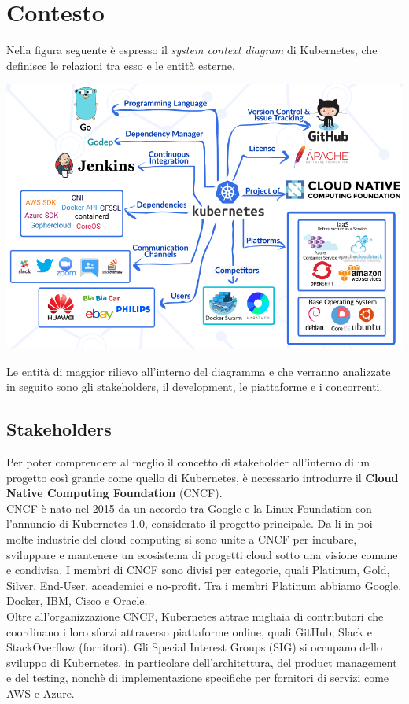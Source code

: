 \documentclass[12pt, a4paper]{report}
\begin{document}
\section{Contesto}
Nella figura seguente è espresso il \textit{system context diagram} di Kubernetes, che definisce le relazioni tra esso e le entità esterne.
\begin{center}
  \includegraphics[scale = 0.6]{Images/ContextModelDiagram}
\end{center}
Le entità di maggior rilievo all'interno del diagramma e che verranno analizzate in seguito sono gli stakeholders, il development, le piattaforme e i concorrenti.
\subsection{Stakeholders}
Per poter comprendere al meglio il concetto di stakeholder all'interno di un progetto così grande come quello di Kubernetes, è necessario introdurre il \textbf{Cloud Native Computing Foundation} (CNCF).\\
CNCF è nato nel 2015 da un accordo tra Google e la Linux Foundation con l'annuncio di Kubernetes 1.0, considerato il progetto principale. Da li in poi molte industrie del cloud computing si sono unite a CNCF per incubare, sviluppare e mantenere un ecosistema di progetti cloud sotto una visione comune e condivisa. I membri di CNCF sono divisi per categorie, quali Platinum, Gold, Silver, End-User, accademici e no-profit. Tra i membri Platinum abbiamo Google, Docker, IBM, Cisco e Oracle.\\
Oltre all'organizzazione CNCF, Kubernetes attrae migliaia di contributori che coordinano i loro sforzi attraverso piattaforme online, quali GitHub, Slack e StackOverflow (fornitori). Gli Special Interest Groups (SIG) si occupano dello sviluppo di Kubernetes, in particolare dell'architettura, del product management e del testing, nonchè di implementazione specifiche per fornitori di servizi come AWS e Azure.
\end{document}
